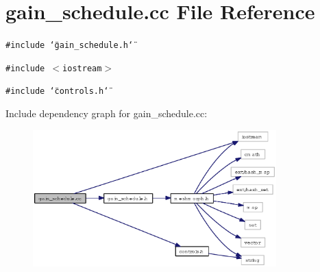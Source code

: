 \section{gain\_\-schedule.cc File Reference}
\label{gain__schedule_8cc}
{\tt \#include \char`\"{}gain\_\-schedule.h\char`\"{}}\par
{\tt \#include $<$iostream$>$}\par
{\tt \#include \char`\"{}controls.h\char`\"{}}\par


Include dependency graph for gain\_\-schedule.cc:\begin{figure}[H]
\begin{center}
\leavevmode
\includegraphics[width=266pt]{gain__schedule_8cc__incl}
\end{center}
\end{figure}
